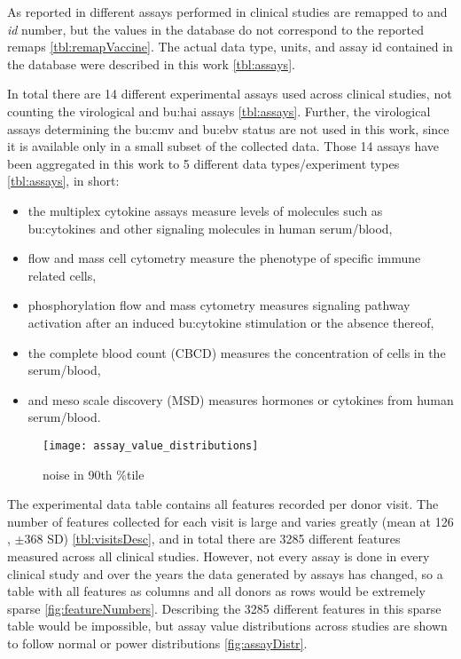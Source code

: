 As reported in \dpaper different assays performed in clinical studies are remapped to and \textit{id} number, but the values in the database do not correspond to the reported remaps \autoref{tbl:remapVaccine}.
The actual data type, units, and assay id contained in the database were described in this work \autoref{tbl:assays}.

In total there are 14 different experimental assays used across clinical studies, not counting the virological and \gls{bu:hai} assays \autoref{tbl:assays}.
Further, the virological assays determining the \gls{bu:cmv} and \gls{bu:ebv} status are not used in this work, since it is available only in a small subset of the collected data.
Those 14 assays have been aggregated in this work to 5 different data types/experiment types \autoref{tbl:assays}, in short:

\begin{itemize}
    \item the multiplex cytokine assays measure levels of molecules such as \gls{bu:cytokine}s and other signaling molecules in human serum/blood,
    \item flow and mass cell cytometry measure the phenotype of specific immune related cells,
    \item phosphorylation flow and mass cytometry measures signaling pathway activation after an induced \gls{bu:cytokine} stimulation or the absence thereof,
    \item the complete blood count (CBCD) measures the concentration of cells in the serum/blood,
    \item and meso scale discovery (MSD) measures hormones or cytokines from human serum/blood.
\end{itemize}

\begin{figure}[htpb]
    \texttt{[image: assay\_value\_distributions]}
    \caption{noise in 90th \%tile}\label{fig:assayDistr}
\end{figure}

The experimental data table contains all features recorded per donor visit.
The number of features collected for each visit is large and varies greatly (mean at 126 , \(\pm \)368 SD) \autoref{tbl:visitsDesc}, and in total there are 3285 different features measured across all clinical studies.
However, not every assay is done in every clinical study  and over the years the data generated by assays has changed, so a table with all features as columns and all donors as rows would be extremely sparse \autoref{fig:featureNumbers}.
Describing the 3285 different features in this sparse table would be impossible, but assay value distributions across studies are shown to follow normal or power distributions \autoref{fig:assayDistr}.

